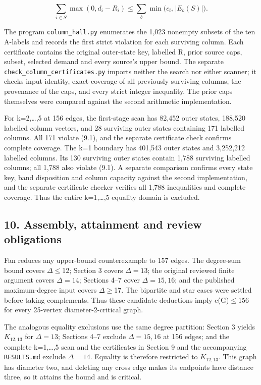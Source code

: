 \documentclass[
  11pt,
]{article}
\begin{document}
\[
\boxed{\quad
\sum_{i\in S}\max(0,d_i-R_i)
\le \sum_b\min\bigl(c_b,|E_b(S)|\bigr).
\quad} \tag{9.1}
\]

The program \texttt{column\_hall.py} enumerates the 1,023 nonempty
subsets of the ten A-labels and records the first strict violation for
each surviving column. Each certificate contains the original
outer-state key, labelled R, prior source caps, subset, selected demand
and every source's upper bound. The separate
\texttt{check\_column\_certificates.py} imports neither the search nor
either scanner; it checks input identity, exact coverage of all
previously surviving columns, the provenance of the caps, and every
strict integer inequality. The prior caps themselves were compared
against the second arithmetic implementation.

For k=2,\ldots,5 at 156 edges, the first-stage scan has 82,452 outer
states, 188,520 labelled column vectors, and 28 surviving outer states
containing 171 labelled columns. All 171 violate (9.1), and the separate
certificate check confirms complete coverage. The k=1 boundary has
401,543 outer states and 3,252,212 labelled columns. Its 130 surviving
outer states contain 1,788 surviving labelled columns; all 1,788 also
violate (9.1). A separate comparison confirms every state key, band
disposition and column capacity against the second implementation, and
the separate certificate checker verifies all 1,788 inequalities and
complete coverage. Thus the entire k=1,\ldots,5 equality domain is
excluded.

\hypertarget{assembly-attainment-and-review-obligations}{%
\subsection{10. Assembly, attainment and review
obligations}\label{assembly-attainment-and-review-obligations}}

Fan reduces any upper-bound counterexample to 157 edges. The degree-sum
bound covers \ensuremath{\Delta}\ensuremath{\le}12; Section 3 covers
\ensuremath{\Delta =13}; the original reviewed finite argument covers
\ensuremath{\Delta =14}; Sections 4--7 cover \ensuremath{\Delta =15,16};
and the published maximum-degree input covers
\ensuremath{\Delta}\ensuremath{\ge}17. The bipartite and star cases were
settled before taking complements. Thus these candidate deductions imply
e(G)\ensuremath{\le}156 for every 25-vertex diameter-2-critical graph.

The analogous equality exclusions use the same degree partition: Section
3 yields \ensuremath{K_{12,13}} for \ensuremath{\Delta =13}; Sections
4--7 exclude \ensuremath{\Delta =15,16} at 156 edges; and the complete
k=1,\ldots,5 scan and the certificates in Section 9 and the accompanying
\texttt{RESULTS.md} exclude \ensuremath{\Delta =14}. Equality is
therefore restricted to \ensuremath{K_{12,13}}. This graph has diameter
two, and deleting any cross edge makes its endpoints have distance
three, so it attains the bound and is critical.
\end{document}
